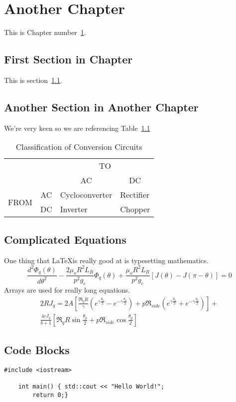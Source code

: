 \chapter{Another Chapter}\label{chap:another}

This is Chapter number~\ref{chap:another}.


\section{First Section in Chapter}\label{another:sec}

This is section~\ref{another:sec}.

\section{Another Section in Another Chapter}

We're very keen so we are referencing Table~\ref{conversion}

\begin{table}[H]
\centering
\begin{tabular}{l|l|l|l|}
\multicolumn{1}{l}{}&\multicolumn{1}{l}{}&\multicolumn{2}{c}{TO}\\ 
\cline{3-4}
\multicolumn{1}{l}{}&\multicolumn{1}{c|}{}&\multicolumn{1}{c|}{AC}&\multicolumn{1}{c|}{DC}\\ 
\cline{2-4}
\multirow{2}{*}{FROM}&\multicolumn{1}{c|}{AC}&Cycloconverter&Rectifier\\ 
&\multicolumn{1}{c|}{DC}&Inverter&Chopper\\ 
\cline{2-4}
\end{tabular}
\caption[Caption for List of Tables]{Classification of Conversion Circuits}
\label{conversion}
\end{table}

\section{Complicated Equations}

One thing that \LaTeX is really good at is typesetting mathematics.
\begin{equation}
\frac{d^2 \Phi_q(\theta)}{d\theta^2}-\frac{2\mu_o R^2 L_R}{p^2 g_e}\Phi_q(\theta)
+\frac{\mu_o R^2 L_R}{p^2 g_e} \left[J(\theta)-J(\pi-\theta)\right]=0
\label{aeqn:mm16}
\end{equation}
Arrays are used for really long equations.
\begin{eqnarray}
2RJ_q=2A\left[\frac{\Re_qR}{\gamma}(e^{\gamma\frac{\theta_p}{2}}-e^{-\gamma\frac{\theta_p}{2}})
+p\Re_{side}(e^{\gamma\frac{\theta_p}{2}}+e^{-\gamma\frac{\theta_p}{2}})\right]+
\nonumber\\
\frac{4cJ_q}{b+1}\left[\Re_qR\sin\frac{\theta_p}{2}+p\Re_{side}\cos\frac{\theta_p}{2}\right]
\end{eqnarray}

\section{Code Blocks}

\begin{lstlisting}[style=c++]
    #include <iostream>
    
    int main() { std::cout << "Hello World!";
        return 0;}
    
\end{lstlisting}
